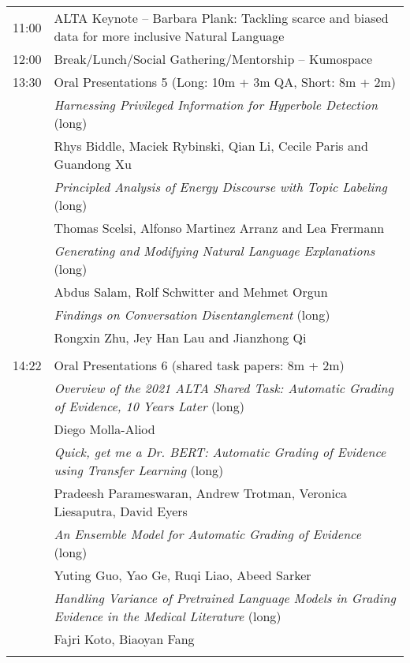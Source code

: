 \begin{longtable}{rl}
11:00 &  ALTA Keynote – Barbara Plank: Tackling scarce and biased data for more inclusive Natural Language\\
12:00 &  Break/Lunch/Social Gathering/Mentorship – Kumospace\\
13:30 &   Oral Presentations 5 (Long: 10m + 3m QA, Short: 8m + 2m) \\
&  \emph{Harnessing Privileged Information for Hyperbole Detection} (long) \\
&  \hspace{.25cm} Rhys Biddle, Maciek Rybinski, Qian Li, Cecile Paris and Guandong Xu  \\
&  \emph{Principled Analysis of Energy Discourse with Topic Labeling} (long) \\
&  \hspace{.25cm}Thomas Scelsi, Alfonso Martinez Arranz and Lea Frermann	  \\
&  \emph{Generating and Modifying Natural Language Explanations} (long) \\
&  \hspace{.25cm} Abdus Salam, Rolf Schwitter and Mehmet Orgun  \\
&  \emph{Findings on Conversation Disentanglement} (long) \\
&  \hspace{.25cm} Rongxin Zhu, Jey Han Lau and Jianzhong Qi \\ \\

14:22 &   Oral Presentations 6 (shared task papers: 8m + 2m) \\
&  \emph{Overview of the 2021 ALTA Shared Task: Automatic Grading of Evidence, 10 Years Later} (long) \\
&  \hspace{.25cm}Diego Molla-Aliod   \\
&  \emph{Quick, get me a Dr. BERT: Automatic Grading of Evidence using Transfer Learning} (long) \\
&  \hspace{.25cm} Pradeesh Parameswaran, Andrew Trotman, Veronica Liesaputra, David Eyers  \\
&  \emph{An Ensemble Model for Automatic Grading of Evidence} (long) \\
&  \hspace{.25cm} Yuting Guo, Yao Ge, Ruqi Liao, Abeed Sarker  \\
&  \emph{Handling Variance of Pretrained Language Models in Grading Evidence in the Medical Literature} (long) \\
&  \hspace{.25cm} Fajri Koto, Biaoyan Fang  \\ \\


\end{longtable}

